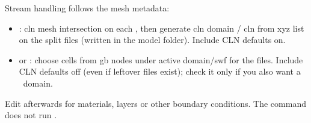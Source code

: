         Stream handling follows the mesh metadata:
        \begin{itemize}
        \item {}: {\sf cln mesh intersection} on each , then {\sf generate cln domain} / {\sf cln from xyz list} on the split files (written in the model folder).  {\sf Include CLN} defaults on.
        \item {} or : {\sf choose cells from gb nodes} under {\sf active domain}/{\sf swf} for the  files.  {\sf Include CLN} defaults off (even if leftover  files exist); check it only if you also want a \cln\ domain.
        \end{itemize}
        Edit  afterwards for materials, layers or other boundary conditions.  The command does not run .

